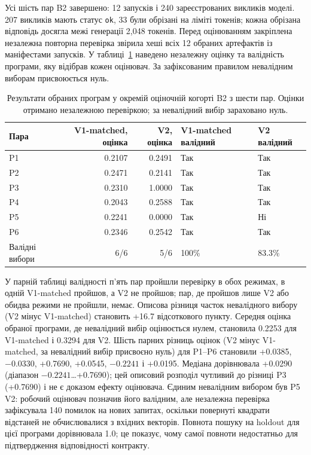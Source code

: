 \documentclass[11pt]{article}
\begin{document}
Усі шість пар B2 завершено: 12 запусків і 240 зареєстрованих викликів моделі. 207 викликів мають статус \texttt{ok}, 33 були обрізані на ліміті токенів; кожна обрізана відповідь досягла межі генерації 2{,}048 токенів. Перед оцінюванням закріплена незалежна повторна перевірка звірила хеші всіх 12 обраних артефактів із маніфестами запусків. У таблиці~\ref{tab:b2} наведено незалежну оцінку та валідність програми, яку відібрав кожен оцінювач. За зафіксованим правилом невалідним виборам присвоюється нуль.

\begin{table}[H]
\centering\small
\caption{Результати обраних програм у окремій оціночній когорті B2 з шести пар. Оцінки отримано незалежною перевіркою; за невалідний вибір зараховано нуль.}
\label{tab:b2}
\begin{tabularx}{\linewidth}{@{}lrrll@{}}
\toprule
Пара & V1-matched, оцінка & V2, оцінка & V1-matched валідний & V2 валідний \\
\midrule
P1 & 0.2107 & 0.2491 & Так & Так \\
P2 & 0.2471 & 0.2141 & Так & Так \\
P3 & 0.2310 & 1.0000 & Так & Так \\
P4 & 0.2043 & 0.2588 & Так & Так \\
P5 & 0.2241 & 0.0000 & Так & Ні \\
P6 & 0.2346 & 0.2542 & Так & Так \\
\midrule
Валідні вибори & 6/6 & 5/6 & 100\% & 83.3\% \\
\bottomrule
\end{tabularx}
\end{table}

У парній таблиці валідності п'ять пар пройшли перевірку в обох режимах, в одній V1-matched пройшов, а V2 не пройшов; пар, де пройшов лише V2 або обидва режими не пройшли, немає. Описова різниця часток невалідного вибору (V2 мінус V1-matched) становить +16.7 відсоткового пункту. Середня оцінка обраної програми, де невалідний вибір оцінюється нулем, становила 0.2253 для V1-matched і 0.3294 для V2. Шість парних різниць оцінок (V2 мінус V1-matched, за невалідний вибір присвоєно нуль) для P1--P6 становили +0.0385, $-0.0330$, +0.7690, +0.0545, $-0.2241$ і +0.0195. Медіана дорівнювала +0.0290 (діапазон $-0.2241$…+0.7690); цей описовий розподіл чутливий до різниці P3 (+0.7690) і не є доказом ефекту оцінювача. Єдиним невалідним вибором був P5 V2: робочий оцінювач позначив його валідним, але незалежна перевірка зафіксувала 140 помилок на нових запитах, оскільки повернуті квадрати відстаней не обчислювалися з вхідних векторів. Повнота пошуку на holdout для цієї програми дорівнювала 1.0; це показує, чому самої повноти недостатньо для підтвердження відповідності контракту.
\end{document}
